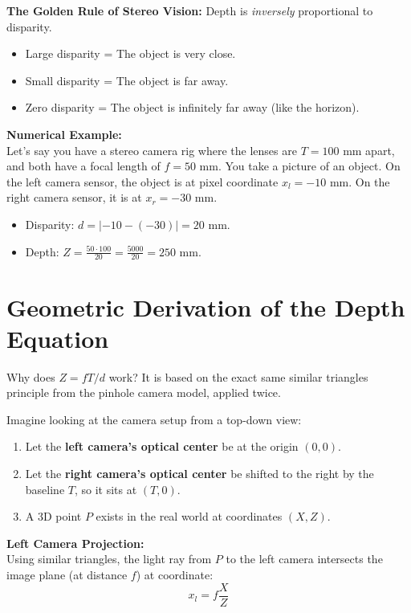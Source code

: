 \documentclass{report}
\begin{document}
\textbf{The Golden Rule of Stereo Vision:} Depth is \textit{inversely} proportional to disparity.
\begin{itemize}
    \item Large disparity = The object is very close.
    \item Small disparity = The object is far away.
    \item Zero disparity = The object is infinitely far away (like the horizon).
\end{itemize}

\textbf{Numerical Example:}\\
Let's say you have a stereo camera rig where the lenses are $T = 100\text{ mm}$ apart, and both have a focal length of $f = 50\text{ mm}$. You take a picture of an object. On the left camera sensor, the object is at pixel coordinate $x_l = -10\text{ mm}$. On the right camera sensor, it is at $x_r = -30\text{ mm}$.
\begin{itemize}
    \item Disparity: $d = |-10 - (-30)| = 20\text{ mm}$.
    \item Depth: $Z = \frac{50 \cdot 100}{20} = \frac{5000}{20} = 250\text{ mm}$.
\end{itemize}

\section{Geometric Derivation of the Depth Equation}
Why does $Z = fT/d$ work? It is based on the exact same similar triangles principle from the pinhole camera model, applied twice.

Imagine looking at the camera setup from a top-down view:
\begin{enumerate}
    \item Let the \textbf{left camera's optical center} be at the origin $(0, 0)$. 
    \item Let the \textbf{right camera's optical center} be shifted to the right by the baseline $T$, so it sits at $(T, 0)$.
    \item A 3D point $P$ exists in the real world at coordinates $(X, Z)$.
\end{enumerate}

\textbf{Left Camera Projection:}\\
Using similar triangles, the light ray from $P$ to the left camera intersects the image plane (at distance $f$) at coordinate:
\begin{equation}
x_l = f \frac{X}{Z}
\end{equation}
\end{document}
